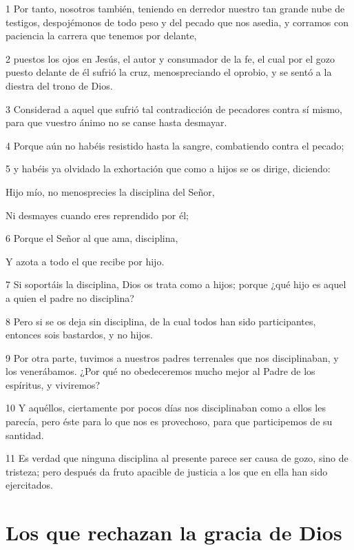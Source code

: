 \par 1 Por tanto, nosotros también, teniendo en derredor nuestro tan grande nube de testigos, despojémonos de todo peso y del pecado que nos asedia, y corramos con paciencia la carrera que tenemos por delante,
\par 2 puestos los ojos en Jesús, el autor y consumador de la fe, el cual por el gozo puesto delante de él sufrió la cruz, menospreciando el oprobio, y se sentó a la diestra del trono de Dios.
\par 3 Considerad a aquel que sufrió tal contradicción de pecadores contra sí mismo, para que vuestro ánimo no se canse hasta desmayar.
\par 4 Porque aún no habéis resistido hasta la sangre, combatiendo contra el pecado;
\par 5 y habéis ya olvidado la exhortación que como a hijos se os dirige, diciendo:
\par Hijo mío, no menosprecies la disciplina del Señor,
\par Ni desmayes cuando eres reprendido por él;
\par 6 Porque el Señor al que ama, disciplina,
\par Y azota a todo el que recibe por hijo.
\par 7 Si soportáis la disciplina, Dios os trata como a hijos; porque ¿qué hijo es aquel a quien el padre no disciplina?
\par 8 Pero si se os deja sin disciplina, de la cual todos han sido participantes, entonces sois bastardos, y no hijos.
\par 9 Por otra parte, tuvimos a nuestros padres terrenales que nos disciplinaban, y los venerábamos. ¿Por qué no obedeceremos mucho mejor al Padre de los espíritus, y viviremos?
\par 10 Y aquéllos, ciertamente por pocos días nos disciplinaban como a ellos les parecía, pero éste para lo que nos es provechoso, para que participemos de su santidad.
\par 11 Es verdad que ninguna disciplina al presente parece ser causa de gozo, sino de tristeza; pero después da fruto apacible de justicia a los que en ella han sido ejercitados.

\section*{Los que rechazan la gracia de Dios}

